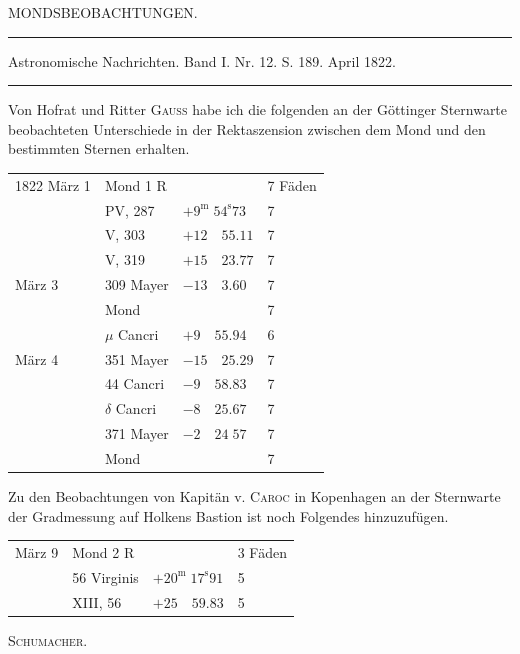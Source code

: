 \clearpage
\hypertarget{native-446-part-lower}{}
\begin{center}
{\large MONDSBEOBACHTUNGEN.}

\noindent\rule{\linewidth}{0.4pt}

Astronomische Nachrichten. Band I. Nr. 12. S. 189. April 1822.

\noindent\rule{\linewidth}{0.4pt}
\end{center}

Von Hofrat und Ritter \textsc{Gauss} habe ich die folgenden an der Göttinger Sternwarte beobachteten Unterschiede in der Rektaszension zwischen dem Mond und den bestimmten Sternen erhalten.

\begin{center}
\begin{tabular}{l|l|l|l}
1822 März 1 & Mond 1 R & & 7 Fäden \\
 & PV, 287 & $+9^{\mathrm{m}}\;54^{\mathrm{s}}73$ & 7 \\
 & V, 303 & $+12\quad55.11$ & 7 \\
 & V, 319 & $+15\quad23.77$ & 7 \\
März 3 & 309 Mayer & $-13\quad3.60$ & 7 \\
 & Mond & & 7 \\
 & $\mu$ Cancri & $+9\quad55.94$ & 6 \\
März 4 & 351 Mayer & $-15\quad25.29$ & 7 \\
 & 44 Cancri & $-9\quad58.83$ & 7 \\
 & $\delta$ Cancri & $-8\quad25.67$ & 7 \\
 & 371 Mayer & $-2\quad24\;57$ & 7 \\
 & Mond & & 7 \\
\end{tabular}
\end{center}

Zu den Beobachtungen von Kapitän v. \textsc{Caroc} in Kopenhagen an der Sternwarte der Gradmessung auf Holkens Bastion ist noch Folgendes hinzuzufügen.

\begin{center}
\begin{tabular}{l|l|l|l}
März 9 & Mond 2 R & & 3 Fäden \\
 & 56 Virginis & $+20^{\mathrm{m}}\;17^{\mathrm{s}}91$ & 5 \\
 & XIII, 56 & $+25\quad59.83$ & 5 \\
\end{tabular}
\end{center}

\begin{flushright}
\textsc{Schumacher}.
\end{flushright}
